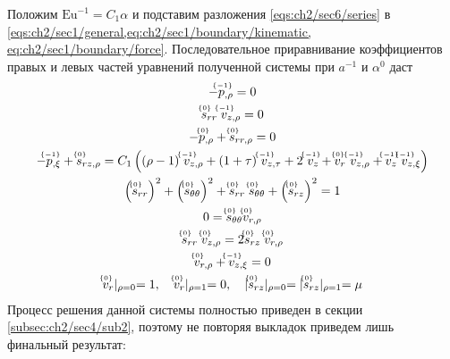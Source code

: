 Положим $\text{Eu}^{-1} = C_1 \alpha$ и подставим разложения \cref{eqs:ch2/sec6/series} в \cref{eqs:ch2/sec1/general,eq:ch2/sec1/boundary/kinematic, eq:ch2/sec1/boundary/force}. Последовательное приравнивание коэффициентов правых и левых частей уравнений полученной системы при $a^{-1}$ и $\alpha^0$ даст
\begin{subequations}
  \label{eqs:ch2/sec6/sub2/main/int}
  \begin{gather}
    \label{eqs:ch2/sec6/sub2/-1/motion:2}
    -\uindex{p}{-1}_{,\rho} = 0
    \\
    \label{eqs:ch2/sec6/sub2/-1/coax:2}
    \uindex{s}{0}_{rr} \; \uindex{v}{-1}_{z,\rho} = 0
    \\
    \label{eqs:ch2/sec6/sub2/0/motion:1}
    -\uindex{p}{0}_{,\rho}+\uindex{s}{0}_{rr,\rho} = 0
    \\
    \label{eqs:ch2/sec6/sub2/0/motion:2}
    -\uindex{p}{-1}_{,\xi} + \uindex{s}{0}_{rz,\rho} = C_1 \left((\rho-1) \ \uindex{v}{-1}_{z,\rho} + (1+\tau) \ \uindex{v}{-1}_{z,\tau} + 2 \ \uindex{v}{-1}_{z} + \uindex{v}{0}_{r} \ \uindex{v}{-1}_{z,\rho} + \uindex{v}{-1}_{z} \ \uindex{v}{-1}_{z,\xi} \right)
    \\
    \label{eqs:ch2/sec6/sub2/0/plasticity}
    \left(\uindex{s}{0}_{rr}\right)^2 + \left(\uindex{s}{0}_{\theta\theta}\right)^2 + \uindex{s}{0}_{rr}\; \uindex{s}{0}_{\theta\theta} + \left(\uindex{s}{0}_{rz}\right)^2 = 1
    \\
    \label{eqs:ch2/sec6/sub2/0/coax:1}
    0 = \uindex{s}{0}_{\theta\theta} \uindex{v}{0}_{r,\rho}
    \\
    \label{eqs:ch2/sec6/sub2/0/coax:2}
    \uindex{s}{0}_{rr} \; \uindex{v}{0}_{z,\rho} = 2 \uindex{s}{0}_{rz} \; \uindex{v}{0}_{r,\rho}
    \\
    \label{eqs:ch2/sec6/sub2/0/uncompress}
    \uindex{v}{0}_{r,\rho} + \uindex{v}{-1}_{z,\xi} = 0
    \\
    \label{eq:ch2/sec6/sub2/boundary/0}
    \uindex{v}{0}_{r}\lvert_{\rho=0} = 1,\quad \uindex{v}{0}_{r}\lvert_{\rho=1} = 0, \quad \lvert \uindex{s}{0}_{rz}\lvert_{\rho=0} = \lvert \uindex{s}{0}_{rz}\lvert_{\rho=1} = \mu
  \end{gather}
\end{subequations}
Процесс решения данной системы полностью приведен в секции \cref{subsec:ch2/sec4/sub2}, поэтому не повторяя выкладок приведем лишь финальный результат:
\begingroup
\allowdisplaybreaks
